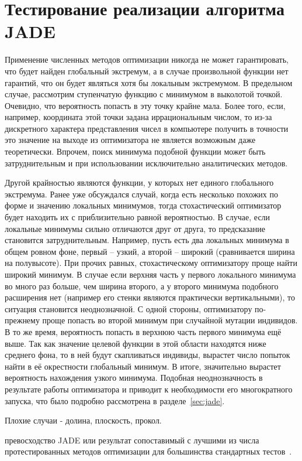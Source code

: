 \section{Тестирование реализации алгоритма JADE}
\label{sec:test-jade}
Применение численных методов оптимизации никогда не может
гарантировать, что будет найден глобальный экстремум, а в случае
произвольной функции нет гарантий, что он будет являться
хотя бы локальным экстремумом.  В предельном случае, рассмотрим ступенчатую
функцию с минимумом в выколотой точкой.  Очевидно, что вероятность
попасть в эту точку крайне мала.  Более того, если, например,
координата этой точки задана иррациональным числом, то из-за
дискретного характера представления чисел в компьютере получить в
точности это значение на выходе из оптимизатора не является возможным
даже теоретически.  Впрочем, поиск минимума подобной функции может
быть затруднительным и при использовании исключительно аналитических
методов.

Другой крайностью являются функции, у которых нет единого глобального
экстремума.  Ранее уже обсуждался случай, когда есть несколько похожих
по форме и значению локальных минимумов, тогда стохастический
оптимизатор будет находить их с приблизительно равной вероятностью.  В
случае, если локальные минимумы сильно отличаются друг от друга, то
предсказание становится затруднительным.  Например, пусть есть два
локальных минимума в общем ровном фоне, первый -- узкий, а второй --
широкий (сравнивается ширина на полувысоте). При прочих равных,
стохастическому оптимизатору проще найти широкий минимум. В
случае если верхняя часть у первого локального минимума во много раз
больше, чем ширина второго, а у второго минимума подобного расширения
нет (например его стенки являются практически вертикальными), то
ситуация становится неоднозначной.  С одной стороны, оптимизатору
по-прежнему проще попасть во второй минимум при случайной мутации
индивидов. В то же время, вероятность попасть в верхнюю часть первого
минимума ещё выше. Так как значение целевой функции в этой области
находятся ниже среднего фона, то в ней будут скапливаться индивиды,
вырастет число попыток найти в её окрестности глобальный минимум.  В
итоге, значительно вырастет вероятность нахождения узкого минимума.
Подобная неоднозначность в результате работы оптимизатора и приводит к
необходимости его многократного запуска, что было подробно рассмотрена
в разделе~\ref{sec:jade}.


Плохие случаи - долина, плоскость, прокол.


превосходство JADE или результат сопоставимый с лучшими из числа
протестированных методов оптимизации для большинства стандартных
тестов~\cite{Schwefel-1981,Rosenbrock-1960,Muhlenbein-1991,back-1996,Griewank-1981}.

